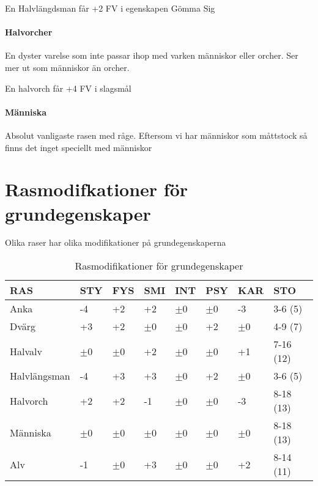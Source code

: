 \documentclass[a4paper, 10pt, titlepage]{article}
\begin{document}
En Halvlängdsman får +2 FV i egenskapen Gömma Sig

\paragraph{Halvorcher} En dyster varelse som inte passar ihop med varken människor eller orcher.
Ser mer ut som människor än orcher.

En halvorch får +4 FV i slagsmål

\paragraph{Människa} Absolut vanligaste rasen med råge. Eftersom vi har människor som måttstock
så finns det inget speciellt med människor

\newpage
\section{Rasmodifkationer för grundegenskaper}
Olika raser har olika modifikationer på grundegenskaperna
\begin{table}[hbp]
  \caption{Rasmodifikationer för grundegenskaper}
  \begin{tabular}{|l|l|l|l|l|l|l|l|}
    \hline
    RAS           & STY     & FYS      & SMI     & INT    & PSY     & KAR     & STO       \\
    \hline
    Anka          & -4      & +2       & +2      & $\pm$0 & $\pm$0  & -3      & 3-6 (5)   \\
    \hline
    Dvärg         & +3      & +2       & $\pm$0  & $\pm$0 & +2      & $\pm$0  & 4-9 (7)   \\
    \hline
    Halvalv       & $\pm$0  & $\pm$0   & +2      & $\pm$0 & $\pm$0  & +1      & 7-16 (12) \\
    \hline
    Halvlängsman  & -4      & +3       & +3      & $\pm$0 & +2      & $\pm$0  & 3-6 (5)   \\
    \hline
    Halvorch      & +2      & +2       & -1      & $\pm$0 & $\pm$0  & -3      & 8-18 (13) \\
    \hline
    Människa      & $\pm$0  & $\pm$0   & $\pm$0  & $\pm$0 & $\pm$0  & $\pm$0  & 8-18 (13) \\
    \hline
    Alv           & -1      & $\pm$0   & +3      & $\pm$0 & $\pm$0  & +2      & 8-14 (11) \\
    \hline
  \end{tabular}
\end{table}
\end{document}
